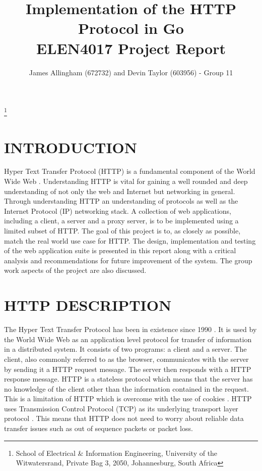 \documentclass[10pt,twocolumn]{witseiepaper}
\begin{document}
\title{Implementation of the HTTP Protocol in Go \\ ELEN4017 Project Report}

\author{James Allingham (672732) and Devin Taylor (603956) - Group 11}
\thanks{School of Electrical \& Information Engineering, University of the
Witwatersrand, Private Bag 3, 2050, Johannesburg, South Africa}



\abstract{}



\maketitle

\section{INTRODUCTION} \label{intro}

Hyper Text Transfer Protocol (HTTP) is a fundamental component of the World Wide Web \cite{kurose}. Understanding HTTP is vital for gaining a well rounded and deep understanding of not only the web and Internet but networking in general. Through understanding HTTP an understanding of protocols as well as the Internet Protocol (IP) networking stack. A collection of web applications, including a client, a server and a proxy server, is to be implemented using a limited subset of HTTP. The goal of this project is to, as closely as possible, match the real world use case for HTTP. The design, implementation and testing of the web application suite is presented in this report along with a critical analysis and recommendations for future improvement of the system. The group work aspects of the project are also discussed. 

\section{HTTP DESCRIPTION}

The Hyper Text Transfer Protocol has been in existence since 1990 \cite{rfc7230}. It is used by the World Wide Web as an application level protocol for transfer of information in a distributed system. It consists of two programs: a client and a server. The client, also commonly referred to as the browser, communicates with the server by sending it a HTTP request message. The server then responds with a HTTP response message. HTTP is a stateless protocol which means that the server has no knowledge of the client other than the information contained in the request. This is a limitation of HTTP which is overcome with the use of cookies \cite{kurose}. HTTP uses Transmission Control Protocol (TCP) as its underlying transport layer protocol \cite{kurose}. This means that HTTP does not need to worry about reliable data transfer issues such as out of sequence packets or packet loss.  
\end{document}

